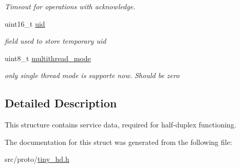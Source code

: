 \begin{DoxyCompactItemize}
\begin{DoxyCompactList}\small\item\em Timeout for operations with acknowledge. \end{DoxyCompactList}\item 
\mbox{\label{structSTinyHdData___a7084eac08b744ad0aa2624b854866825}} 
uint16\+\_\+t \hyperlink{structSTinyHdData___a7084eac08b744ad0aa2624b854866825}{uid}
\begin{DoxyCompactList}\small\item\em field used to store temporary uid \end{DoxyCompactList}\item 
\mbox{\label{structSTinyHdData___a37dca10adb0dd210f02365b7fa20a598}} 
uint8\+\_\+t \hyperlink{structSTinyHdData___a37dca10adb0dd210f02365b7fa20a598}{multithread\+\_\+mode}
\begin{DoxyCompactList}\small\item\em only single thread mode is supporte now. Should be zero \end{DoxyCompactList}\end{DoxyCompactItemize}


\subsection{Detailed Description}
This structure contains service data, required for half-\/duplex functioning. 

The documentation for this struct was generated from the following file\+:\begin{DoxyCompactItemize}
\item 
src/proto/\hyperlink{tiny__hd_8h}{tiny\+\_\+hd.\+h}\end{DoxyCompactItemize}
